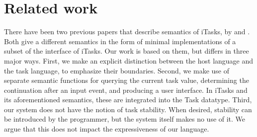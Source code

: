 


\section{Related work}

\label{sec:relatedwork}

There have been two previous papers that describe semantics of iTasks, by \citet{conf/ifl/KoopmanPA08} and \citet{conf/ppdp/PlasmeijerLMAK12}.
Both give a different semantics in the form of minimal implementations of a subset of the interface of iTasks.
Our work is based on them, but differs in three major ways.
First, we make an explicit distinction between the host language and the task language, to emphasize their boundaries.
Second, we make use of separate semantic functions for querying the current task value, determining the continuation after an input event, and producing a user interface.
In iTasks and its aforementioned semantics, these are integrated into the Task datatype.
Third, our system does not have the notion of task stability.
When desired, stability can be introduced by the programmer, but the system itself makes no use of it.
We argue that this does not impact the expressiveness of our language.


